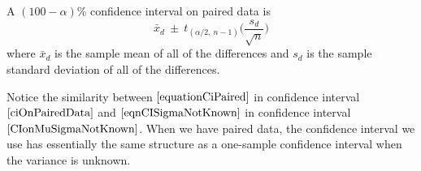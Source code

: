 \begin{ci}
\label{ciOnPairedData}
A $(100 - \alpha)\%$ confidence interval on paired data
is
	\begin{equation}\label{equationCiPaired}
	\bar{x}_{d}	 ~\pm~		t_{(\alpha / 2, ~n-1)}  
	\bigg( \displaystyle\frac{ s_{d} }{ \sqrt{n} } \bigg)
	\end{equation}
where $\bar{x}_{d}$ is the sample mean of all of the differences
and $s_{d}$ is the sample standard deviation of all of the differences.
\end{ci}


\begin{nt}
Notice the similarity between $\ref{equationCiPaired}$
in confidence interval $\ref{ciOnPairedData}$
and $\ref{eqnCISigmaNotKnown}$
in confidence interval $\ref{CIonMuSigmaNotKnown}$.
When we have paired data, the confidence interval we use 
has essentially the same structure as
a one-sample confidence interval when the variance is unknown.
\end{nt}






